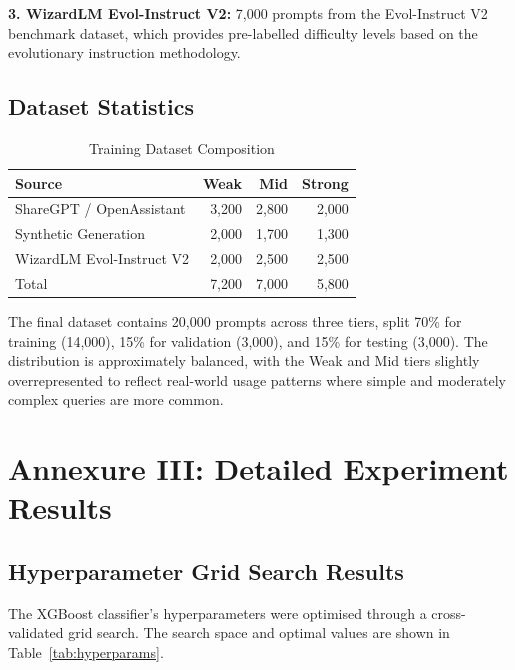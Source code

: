 \documentclass[oneside,12pt,a4paper]{report}
\begin{document}
\textbf{3. WizardLM Evol-Instruct V2:} 7,000 prompts from the Evol-Instruct V2 benchmark dataset, which provides pre-labelled difficulty levels based on the evolutionary instruction methodology.

\section{Dataset Statistics}

\begin{table}[htbp]
  \centering
  \caption{Training Dataset Composition}
  \label{tab:dataset_composition}
  \begin{tabular}{lrrr}
    \toprule
    \textbf{Source} & \textbf{Weak} & \textbf{Mid} & \textbf{Strong} \\
    \midrule
    ShareGPT / OpenAssistant & 3,200 & 2,800 & 2,000 \\
    Synthetic Generation & 2,000 & 1,700 & 1,300 \\
    WizardLM Evol-Instruct V2 & 2,000 & 2,500 & 2,500 \\
    \midrule
    Total & 7,200 & 7,000 & 5,800 \\
    \bottomrule
  \end{tabular}
\end{table}

The final dataset contains 20,000 prompts across three tiers, split 70\% for training (14,000), 15\% for validation (3,000), and 15\% for testing (3,000). The distribution is approximately balanced, with the Weak and Mid tiers slightly overrepresented to reflect real-world usage patterns where simple and moderately complex queries are more common.

\chapter{Annexure III: Detailed Experiment Results}

\section{Hyperparameter Grid Search Results}

The XGBoost classifier's hyperparameters were optimised through a cross-validated grid search. The search space and optimal values are shown in Table~\ref{tab:hyperparams}.
\end{document}
